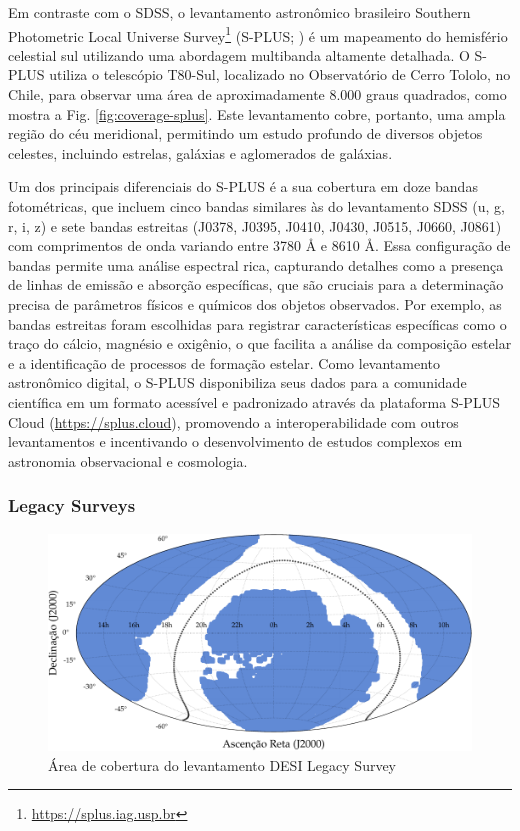 Em contraste com o SDSS, o levantamento astronômico brasileiro Southern Photometric Local Universe Survey\footnote{\url{https://splus.iag.usp.br}} (S-PLUS; \citealp{splus}) é um mapeamento do hemisfério celestial sul utilizando uma abordagem multibanda altamente detalhada. O S-PLUS utiliza o telescópio T80-Sul, localizado no Observatório de Cerro Tololo, no Chile, para observar uma área de aproximadamente 8.000 graus quadrados, como mostra a Fig. \ref{fig:coverage-splus}. Este levantamento cobre, portanto, uma ampla região do céu meridional, permitindo um estudo profundo de diversos objetos celestes, incluindo estrelas, galáxias e aglomerados de galáxias.

Um dos principais diferenciais do S-PLUS é a sua cobertura em doze bandas fotométricas, que incluem cinco bandas similares às do levantamento SDSS (u, g, r, i, z) e sete bandas estreitas (J0378, J0395, J0410, J0430, J0515, J0660, J0861) com comprimentos de onda variando entre 3780 $\si{\angstrom}$ e 8610 $\si{\angstrom}$. Essa configuração de bandas permite uma análise espectral rica, capturando detalhes como a presença de linhas de emissão e absorção específicas, que são cruciais para a determinação precisa de parâmetros físicos e químicos dos objetos observados. Por exemplo, as bandas estreitas foram escolhidas para registrar características específicas como o traço do cálcio, magnésio e oxigênio, o que facilita a análise da composição estelar e a identificação de processos de formação estelar. Como levantamento astronômico digital, o S-PLUS disponibiliza seus dados para a comunidade científica em um formato acessível e padronizado através da plataforma S-PLUS Cloud (\url{https://splus.cloud}), promovendo a interoperabilidade com outros levantamentos e incentivando o desenvolvimento de estudos complexos em astronomia observacional e cosmologia.




\subsubsection{Legacy Surveys}
\label{sec:legacy}
\begin{figure}[!ht]
  \caption{Área de cobertura do levantamento DESI Legacy Survey}
  \label{fig:coverage-legacy}
  \includegraphics[width=\linewidth]{notebooks/plots/legacy_footprint.pdf}
\end{figure}


